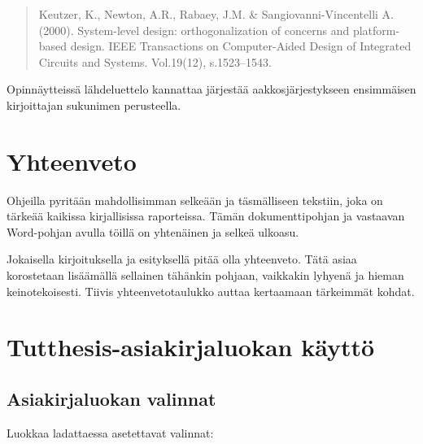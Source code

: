 \documentclass[globalnumbering,centeredcaptions,draftfooter]{tutthesis/tutthesis} %
\newif\ifnameyear
\begin{document}
\begin{quotation}
Keutzer, K., Newton, A.R., Rabaey, J.M. \& Sangiovanni-Vincentelli A. (2000). System-level design: orthogonalization of concerns and platform-based design. IEEE Transactions on Computer-Aided Design of Integrated Circuits and Systems. Vol.19(12), s.1523--1543.
\end{quotation}

Opinnäytteissä lähdeluettelo kannattaa järjestää aakkosjärjestykseen ensimmäisen kirjoittajan sukunimen perusteella.



\chapter{Yhteenveto}
\label{ch:yhteenveto}

Ohjeilla pyritään mahdollisimman selkeään ja täsmälliseen tekstiin, joka on tärkeää kaikissa kirjallisissa raporteissa.
Tämän dokumenttipohjan ja vastaavan Word-pohjan avulla töillä on yhtenäinen ja selkeä ulkoasu.

Jokaisella kirjoituksella ja esityksellä pitää olla yhteenveto.
Tätä asiaa korostetaan lisäämällä sellainen tähänkin pohjaan, vaikkakin lyhyenä ja hieman keinotekoisesti.
Tiivis yhteenvetotaulukko auttaa kertaamaan tärkeimmät kohdat.



\addto\extrasenglish{\btxifchangecaseoff} %

\ifnameyear
  
\else
  
\fi





\appendix

\chapter{Tutthesis-asiakirjaluokan käyttö}
\label{ch:classdocumentation}

\section{Asiakirjaluokan valinnat}

Luokkaa ladattaessa asetettavat valinnat:
\end{document}

